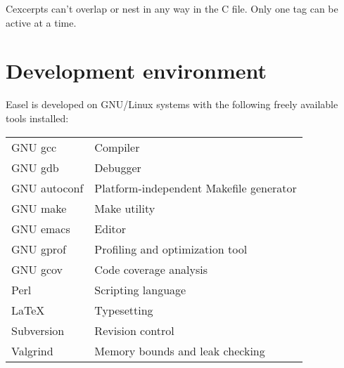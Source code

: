 Cexcerpts can't overlap or nest in any way in the C file. Only one tag
can be active at a time.



\section{Development environment}

Easel is developed on GNU/Linux systems with the following freely
available tools installed:

{\small
\begin{tabular}{ll}
GNU gcc         & Compiler \\
GNU gdb         & Debugger\\
GNU autoconf    & Platform-independent Makefile generator\\
GNU make        & Make utility\\
GNU emacs       & Editor    \\
GNU gprof       & Profiling and optimization tool \\
GNU gcov        & Code coverage analysis\\
Perl            & Scripting language\\
LaTeX           & Typesetting\\
Subversion      & Revision control\\
Valgrind        & Memory bounds and leak checking\\
\end{tabular}
}




